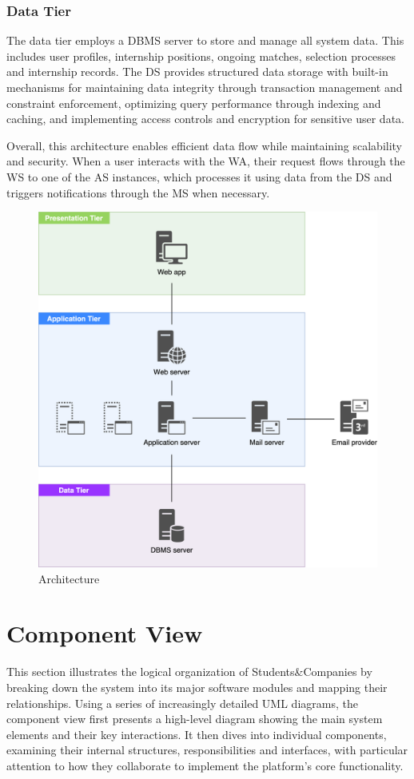 \subsubsection{Data Tier}
The data tier employs a DBMS server to store and manage all system data.
This includes user profiles, internship positions, ongoing matches, selection processes and internship records.
The DS provides structured data storage with built-in mechanisms for maintaining data integrity through transaction management and constraint enforcement, optimizing query performance through indexing and caching, and implementing access controls and encryption for sensitive user data.

Overall, this architecture enables efficient data flow while maintaining scalability and security.
When a user interacts with the WA, their request flows through the WS to one of the AS instances, which processes it using data from the DS and triggers notifications through the MS when necessary.

\begin{figure}[h]
    \centering
    \includegraphics[width=14cm]{images/architecture.png}
    \caption{Architecture}
\end{figure}

\section{Component View}
This section illustrates the logical organization of Students\&Companies by breaking down the system into its major software modules and mapping their relationships.
Using a series of increasingly detailed UML diagrams, the component view first presents a high-level diagram showing the main system elements and their key interactions.
It then dives into individual components, examining their internal structures, responsibilities and interfaces, with particular attention to how they collaborate to implement the platform's core functionality.

